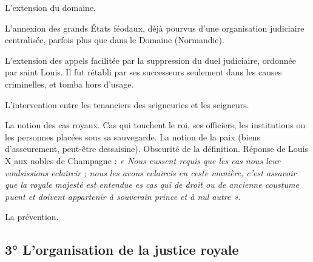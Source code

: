 \documentclass[french,twoside]{book} %
\begin{document}
\begin{listalpha}[itemsep=0pt,]
\item L’extension du domaine.
\item L’annexion des grands États féodaux, déjà pourvus d’une organisation judiciaire centralisée, parfois plus que dans le Domaine (Normandie).
\item L’extension des appels facilitée par la suppression du duel judiciaire, ordonnée par saint Louis. Il fut rétabli par ses successeurs seulement dans les causes criminelles, et tomba hors d’usage.
\item L’intervention entre les tenanciers des seigneuries et les seigneurs.
\item La notion des cas royaux. Cas qui touchent le roi, ses officiers, les institutions ou les personnes placées sous sa sauvegarde. La notion de la paix (biens d’asseurement, peut-être dessaisine). Obscurité de la définition. Réponse de Louis X aux nobles de Champagne : \emph{« Nous eussent requis que les cas nous leur voulsissions eclaircir ; nous les avons eclaircis en ceste manière, c’est assavoir que la royale majesté est entendue es cas qui de droit ou de ancienne coustume puent et doivent appartenir à souverain prince et à nul autre ».} 
\item La prévention.

\end{listalpha}\subsection[3° L’organisation de la justice royale]{3° L’organisation de la justice royale}
\end{document}
